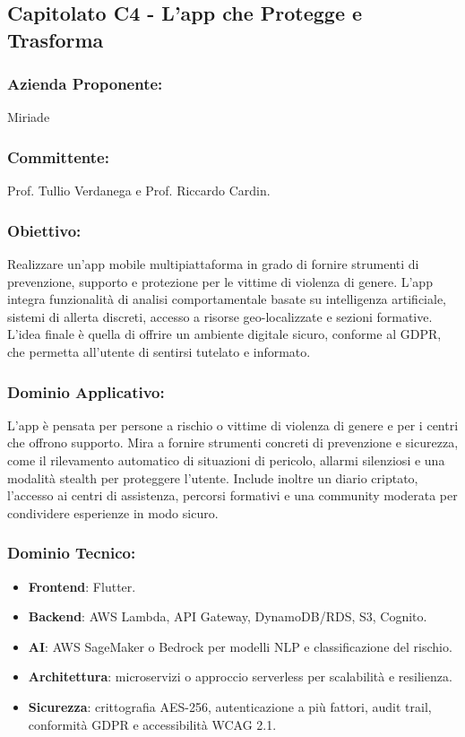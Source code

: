 \documentclass[a4paper,12pt]{article}
\begin{document}
\subsection{Capitolato C4 - L'app che Protegge e Trasforma}
\subsubsection*{Azienda Proponente:} Miriade
\subsubsection*{Committente:} Prof. Tullio Verdanega e Prof. Riccardo Cardin.
\subsubsection*{Obiettivo:}
Realizzare un'app mobile multipiattaforma in grado di fornire strumenti di prevenzione, supporto e protezione per le vittime di violenza di genere.
L'app integra funzionalità di analisi comportamentale basate su intelligenza artificiale, sistemi di allerta discreti, accesso a risorse geo-localizzate e sezioni formative.
L'idea finale è quella di offrire un ambiente digitale sicuro, conforme al GDPR, che permetta all'utente di sentirsi tutelato e informato.

\subsubsection*{Dominio Applicativo:}
L'app è pensata per persone a rischio o vittime di violenza di genere e per i centri che offrono supporto.
Mira a fornire strumenti concreti di prevenzione e sicurezza, come il rilevamento automatico di situazioni di pericolo, allarmi silenziosi e una modalità stealth per proteggere l'utente.
Include inoltre un diario criptato, l'accesso ai centri di assistenza, percorsi formativi e una community moderata per condividere esperienze in modo sicuro.

\subsubsection*{Dominio Tecnico:}
\begin{itemize}[leftmargin=*]
    \item \textbf{Frontend}: Flutter.
    \item \textbf{Backend}: AWS Lambda, API Gateway, DynamoDB/RDS, S3, Cognito.
    \item \textbf{AI}: AWS SageMaker o Bedrock per modelli NLP e classificazione del rischio.
    \item \textbf{Architettura}: microservizi o approccio serverless per scalabilità e resilienza.
    \item \textbf{Sicurezza}: crittografia AES-256, autenticazione a più fattori, audit trail, conformità GDPR e accessibilità WCAG 2.1.
\end{itemize}
\end{document}
